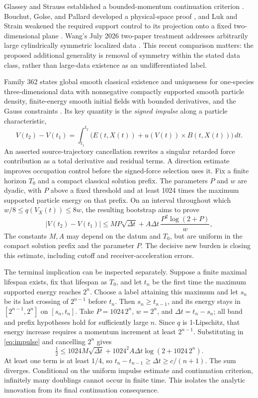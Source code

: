 \documentclass[11pt]{article}
\begin{document}
Glassey and Strauss established a bounded-momentum continuation
criterion \citep{GlasseyStrauss1986}. Bouchut, Golse, and Pallard developed
a physical-space proof \citep{BouchutGolsePallard2003}, and Luk and Strain
weakened the required support control to its projection onto a fixed
two-dimensional plane \citep{LukStrain2014Continuation}. Wang's July 2026
two-paper treatment addresses arbitrarily large cylindrically symmetric
localized data \citep{Wang2026I,Wang2026II}. This recent comparison matters:
the proposed additional generality is removal of symmetry within the
stated data class, rather than large-data existence as an undifferentiated
label.

Family 362 states global smooth classical existence and uniqueness for
one-species three-dimensional data with nonnegative compactly supported
smooth particle density, finite-energy smooth initial fields with bounded
derivatives, and the Gauss constraints \citep{OAIVlasov}. Its key quantity
is the \emph{signed impulse} along a particle characteristic,
\[
 V(t_2)-V(t_1)=\int_{t_1}^{t_2}
 \bigl(E(t,X(t))+u(V(t))\times B(t,X(t))\bigr)\,dt.
\]
An asserted source-trajectory cancellation rewrites a singular retarded
force contribution as a total derivative and residual terms. A direction
estimate improves occupation control before the signed-force selection
uses it. Fix a finite horizon $T_0$ and a compact classical solution
prefix. The parameters $P$ and $w$ are dyadic, with $P$ above a fixed
threshold and at least 1024 times the maximum supported particle energy
on that prefix. On an interval throughout which
$w/8\le q(V_X(t))\le8w$, the resulting bootstrap aims to prove
\begin{equation}\label{eq:impulse}
 |V(t_2)-V(t_1)|\le MP\sqrt{\Delta t}
       +A\Delta t\,\frac{P^2\log(2+P)}{w},
\end{equation}
The constants $M,A$ may depend on the datum and $T_0$, but are uniform
in the compact solution prefix and the parameter $P$. The decisive new
burden is closing this estimate,
including cutoff and receiver-acceleration errors.

The terminal implication can be inspected separately. Suppose a finite
maximal lifespan exists, fix that lifespan as $T_0$, and let $t_n$ be the
first time the maximum supported energy reaches $2^n$. Choose a label
attaining this maximum and let $s_n$ be its last crossing of $2^{n-1}$
before $t_n$. Then $s_n\ge t_{n-1}$, and its energy stays in
$[2^{n-1},2^n]$ on $[s_n,t_n]$. Take $P=1024\,2^n$, $w=2^n$, and
$\Delta t=t_n-s_n$; all band and prefix hypotheses hold for sufficiently
large $n$. Since $q$ is 1-Lipschitz, that energy increase requires a
momentum increment at least $2^{n-1}$. Substituting in
\eqref{eq:impulse} and cancelling $2^n$ gives
\[
 \tfrac12\le1024M\sqrt{\Delta t}
       +1024^2A\Delta t\log(2+1024\,2^n).
\]
At least one term is at least $1/4$, so
$t_n-t_{n-1}\ge\Delta t\ge c/(n+1)$. The sum diverges. Conditional on the
uniform impulse estimate and continuation criterion, infinitely many
doublings cannot occur in finite time. This isolates the analytic
innovation from its final continuation consequence.
\end{document}
